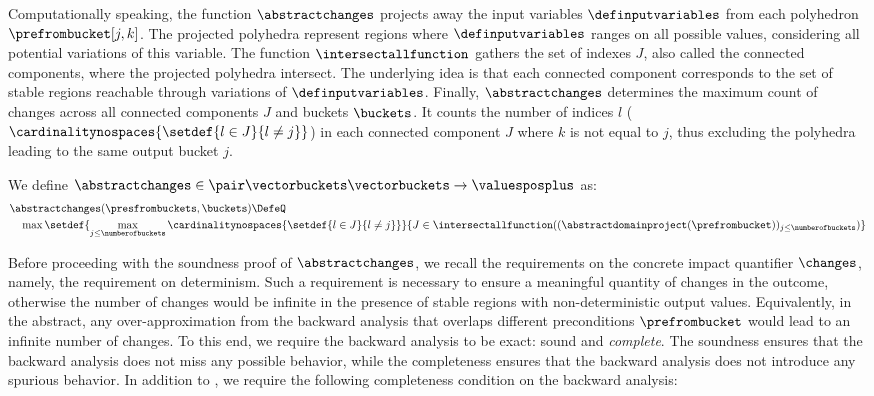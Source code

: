 Computationally speaking, the function $\abstractchanges$ projects away the input variables $\definputvariables$ from each polyhedron $\prefrombucket[{j, k}]$.
The projected polyhedra represent regions where $\definputvariables$ ranges on all possible values, considering all potential variations of this variable.
The function $\intersectallfunction$ gathers the set of indexes $J$, also called the connected components, where the projected polyhedra intersect.
The underlying idea is that each connected component corresponds to the set of stable regions reachable through variations of $\definputvariables$.
%
Finally, $\abstractchanges$ determines the maximum count of changes across all connected components $J$ and buckets $\buckets$.
It counts the number of indices $l$ (\cf{} $\cardinalitynospaces{\setdef{l \in J}{l \neq j}}$) in each connected component $J$ where $k$ is not equal to $j$, thus excluding the polyhedra leading to the same output bucket $j$.


\begin{definition}[$\abstractchanges$]
  We define $\abstractchanges\in\pair\vectorbuckets\vectorbuckets\to\valuesposplus$ as:
  \begin{align*}
    &\abstractchanges(\presfrombuckets, \buckets) \DefeQ \\
      &\quad \max
      \setdef{
        \max_{j \le \numberofbuckets} \cardinalitynospaces{\setdef{l \in J}{l \neq j}}
      }{
        J \in \intersectallfunction((\abstractdomainproject(\prefrombucket))_{j\le\numberofbuckets})
      }
  \end{align*}
\end{definition}

Before proceeding with the soundness proof of $\abstractchanges$, we recall the requirements on the concrete impact quantifier $\changes$, namely, the requirement on determinism.
Such a requirement is necessary to ensure a meaningful quantity of changes in the outcome, otherwise the number of changes would be infinite in the presence of stable regions with non-deterministic output values.
Equivalently, in the abstract, any over-approximation from the backward analysis that overlaps different preconditions $\prefrombucket$ would lead to an infinite number of changes.
To this end, we require the backward analysis to be exact: sound and \emph{complete}.
The soundness ensures that the backward analysis does not miss any possible behavior, while the completeness ensures that the backward analysis does not introduce any spurious behavior.
In addition to , we require the following completeness condition on the backward analysis:

